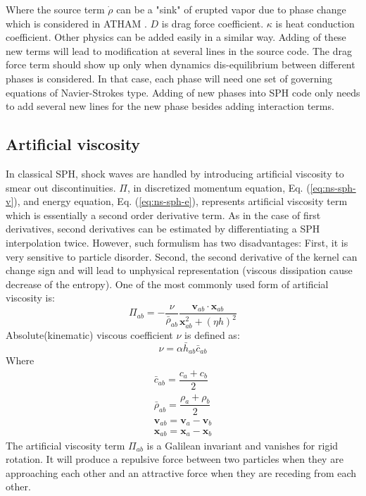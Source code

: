 \documentclass[journal abbreviation, manuscript]{copernicus}
\begin{document}
Where the source term $\dot{\rho}$ can be a "sink" of erupted vapor due to phase change which is considered in ATHAM \citep{oberhuber1998volcanic}. $D$ is drag force coefficient. $\kappa$ is heat conduction coefficient. Other physics can be added easily in a similar way. Adding of these new terms will lead to modification at several lines in the source code. The drag force term should show up only when dynamics dis-equilibrium between different phases is considered. In that case, each phase will need one set of governing equations of Navier-Strokes type. Adding of new phases into SPH code only needs to add several new lines for the new phase besides adding interaction terms.
\subsection{Artificial viscosity} \label{sec:artificial-viscosity}
In classical SPH, shock waves are handled by introducing artificial viscosity to smear out discontinuities. $\Pi$, in discretized momentum equation, Eq. (\ref{eq:ns-sph-v}), and energy equation, Eq. (\ref{eq:ns-sph-e}), represents artificial viscosity term which is essentially a second order derivative term. As in the case of first derivatives, second derivatives can be estimated by differentiating a SPH interpolation twice. However, such formulism has two disadvantages: First, it is very sensitive to particle disorder. Second, the second derivative of the kernel can change sign and will lead to unphysical representation (viscous dissipation cause decrease of the entropy). 
One of the most commonly used form of artificial viscosity is:
\begin{equation}
\Pi_{ab}=- \frac{\nu}{\bar{\rho}_{ab}} \dfrac{ \textbf{v}_{ab} \cdot \textbf{x}_{ab}}{\textbf{x}_{ab}^2 + (\eta h)^2}
\label{eq:art-vis-original}
\end{equation}
Absolute(kinematic) viscous coefficient $\nu$ is defined as:
\begin{equation}
\nu = \alpha \bar{h}_{ab} \bar{c}_{ab}
\end{equation}
Where 
\begin{align}
\bar{c}_{ab} = \dfrac{c_a + c_b}{2} \\
\bar{\rho}_{ab} = \dfrac{\rho_a + \rho_b}{2} \\
\textbf{v}_{ab}=\textbf{v}_a-\textbf{v}_b \\
\textbf{x}_{ab}=\textbf{x}_a-\textbf{x}_b
\end{align}
The artificial viscosity term $\Pi_{ab}$ is a Galilean invariant and vanishes for rigid rotation. It will produce a repulsive force between two particles when they are approaching each other and an attractive force when they are receding from each other. \\
\end{document}
